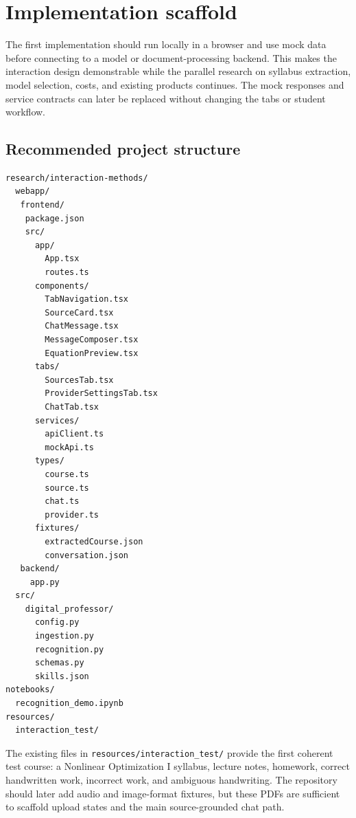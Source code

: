 \documentclass[11pt]{article}
\begin{document}
\section{Implementation scaffold}
The first implementation should run locally in a browser and use mock data before connecting to a model or document-processing backend. This makes the interaction design demonstrable while the parallel research on syllabus extraction, model selection, costs, and existing products continues. The mock responses and service contracts can later be replaced without changing the tabs or student workflow.

\subsection{Recommended project structure}
\begin{verbatim}
research/interaction-methods/
  webapp/
   frontend/
    package.json
    src/
      app/
        App.tsx
        routes.ts
      components/
        TabNavigation.tsx
        SourceCard.tsx
        ChatMessage.tsx
        MessageComposer.tsx
        EquationPreview.tsx
      tabs/
        SourcesTab.tsx
        ProviderSettingsTab.tsx
        ChatTab.tsx
      services/
        apiClient.ts
        mockApi.ts
      types/
        course.ts
        source.ts
        chat.ts
        provider.ts
      fixtures/
        extractedCourse.json
        conversation.json
   backend/
     app.py
  src/
    digital_professor/
      config.py
      ingestion.py
      recognition.py
      schemas.py
      skills.json
notebooks/
  recognition_demo.ipynb
resources/
  interaction_test/
\end{verbatim}

The existing files in \texttt{resources/interaction\_test/} provide the first coherent test course: a Nonlinear Optimization I syllabus, lecture notes, homework, correct handwritten work, incorrect work, and ambiguous handwriting. The repository should later add audio and image-format fixtures, but these PDFs are sufficient to scaffold upload states and the main source-grounded chat path.
\end{document}
